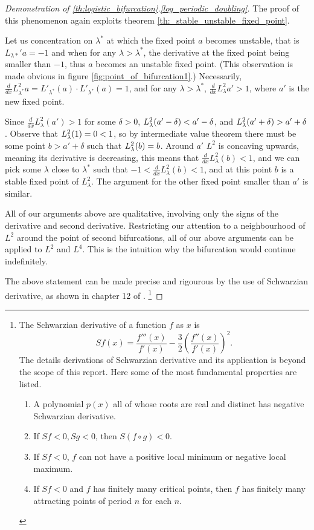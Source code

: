 \begin{proof}[Demonstration of \ref{th:logistic_bifurcation}.\ref{log_periodic_doubling}]
	The proof of this phenomenon again exploits theorem \ref{th:_stable_unstable_fixed_point}.

	Let us concentration on $\lambda^*$ at which the fixed point $a$ becomes unstable, that is $L_{\lambda*}' a  = - 1$ and when for any $\lambda > \lambda^*$, the derivative at the fixed point being smaller than $-1$, thus $a$ becomes an unstable fixed point. (This observation is made obvious in figure \ref{fig:point_of_bifurcation1}.)
	Necessarily, $\frac{d}{dx}L_{\lambda^*}^2 a = L'_{\lambda^*}(a) \cdot L'_{\lambda^*}(a) = 1$,
	and for any $\lambda > \lambda^*$, $\frac{d}{dx}L_{\lambda}^2a'> 1$, where $a'$ is the new fixed point.

	Since $\frac{d}{dx}L_{\lambda}^2(a') > 1$ for some $\delta > 0$, $L_{\lambda}^2(a' - \delta) < a' - \delta$, and $L_{\lambda}^2(a' + \delta) > a' + \delta$. 
	Observe that $L_{\lambda}^2(1) = 0 < 1$, so by intermediate value theorem there must be some point $b > a' + \delta$ such that $L_{\lambda}^2(b) = b$. 
	Around $a'$ $L^2$ is concaving upwards, meaning its derivative is decreasing, this means that $\frac{d}{dx }L_{\lambda}^2(b) < 1$,
	and we can pick some $\lambda$  close to $\lambda ^*$ such that $-1<\frac{d}{dx }L_{\lambda}^2(b) < 1$, and at this point $b$ is a stable fixed point of $L_{\lambda}^2$.
	The argument for the other fixed point smaller than $a'$ is similar. 

	All of our arguments above are qualitative, involving only the signs of the derivative and second derivative. 
	Restricting our attention to a neighbourhood of $L^2$ around the point of second bifurcations, all of our above arguments can be applied to $L^2$ and $L^4$. 
	This is the intuition why the bifurcation would continue indefinitely.
	
	The above statement can be made precise and rigourous by the use of Schwarzian derivative, as shown in chapter 12 of \cite{Devaney_green_book_chaos_definition}.
	\footnote{
		The Schwarzian derivative of a function $f$ as $x$ is 
		$$
		Sf(x) = \frac{f'''(x)}{f'(x)} - \frac{3}{2} \left(\frac{f''(x)}{f'(x)}\right)^2.
		$$
		The details derivations of Schwarzian derivative and its application is beyond the scope of this report. 
		Here some of the most fundamental properties are listed.
		\begin{enumerate}
			\item A polynomial $p(x)$ all of whose roots are real and distinct has negative Schwarzian derivative.
			\item If $Sf < 0, Sg < 0$, then $S(f\circ g) < 0$.
			\item If $Sf <0$, $f$ can not have a positive local minimum or negative local maximum.
			\item If $Sf < 0$ and $f$ has finitely many critical points, then $f$ has finitely many attracting points of period $n$ for each $n$.
		\end{enumerate}
	}
\end{proof}

